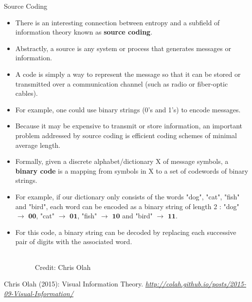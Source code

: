 \begin{vbframe} {Source Coding}
\begin{itemize}
  \item There is an interesting connection between entropy and a subfield of information theory known as \textbf{source coding}.
  \item Abstractly, a source is any system or process that generates messages or information.
  \item A code is simply a way to represent the message so that it can be stored or transmitted over a communication channel (such as radio or fiber-optic cables).
  \item For example, one could use binary strings (0's and 1's) to encode messages.
  \item Because it may be expensive to transmit or store information, an important problem addressed by source coding is efficient coding schemes of minimal average length.
\end{itemize}

\framebreak

\begin{itemize}
  \item Formally, given a discrete alphabet/dictionary X of message symbols, a \textbf{binary code} is a mapping
from symbols in X to a set of codewords of binary strings.
 \item For example, if our dictionary only consists of the words "dog", "cat", "fish" and "bird", each word can be encoded as a binary string of length 2 : "dog" $\rightarrow$ $\mathbf{00}$, "cat" $\rightarrow$ $\mathbf{01}$, "fish" $\rightarrow$ $\mathbf{10}$ and "bird" $\rightarrow$ $\mathbf{11}$.
 \item For this code, a binary string can be decoded by replacing each successive pair of digits with the associated word.
\begin{figure}
    \centering
      \tiny{\\ Credit: Chris Olah\\}
  \end{figure}
\end{itemize}
 {\tiny{Chris Olah (2015): Visual Information Theory. \emph{\url{http://colah.github.io/posts/2015-09-Visual-Information/}}}\par}
\framebreak


\end{vbframe}
